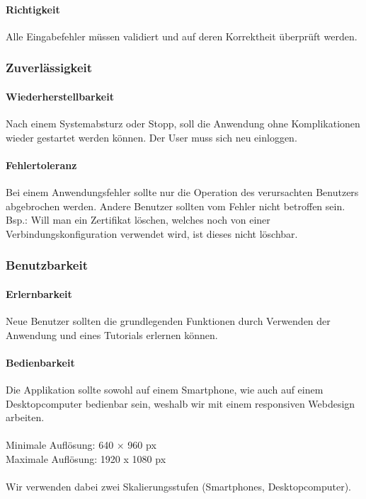 \paragraph{Richtigkeit}
Alle Eingabefehler müssen validiert und auf deren Korrektheit überprüft werden.

\subsubsection{Zuverlässigkeit}

\paragraph{Wiederherstellbarkeit}
Nach einem Systemabsturz oder Stopp, soll die Anwendung ohne Komplikationen wieder gestartet werden können. Der User muss sich neu einloggen.

\paragraph{Fehlertoleranz}
Bei einem Anwendungsfehler sollte nur die Operation des verursachten Benutzers abgebrochen werden. Andere Benutzer sollten vom Fehler nicht betroffen sein.\\
Bsp.: Will man ein Zertifikat löschen, welches noch von einer Verbindungskonfiguration verwendet wird, ist dieses nicht löschbar.

\subsubsection{Benutzbarkeit}

\paragraph{Erlernbarkeit}
Neue Benutzer sollten die grundlegenden Funktionen durch Verwenden der Anwendung und eines Tutorials erlernen können.

\paragraph{Bedienbarkeit}
Die Applikation sollte sowohl auf einem Smartphone, wie auch auf einem Desktopcomputer bedienbar sein, weshalb wir mit einem responsiven Webdesign arbeiten. \\\\
Minimale Auflösung: 	640 × 960 px \\
Maximale Auflösung: 	1920 x 1080 px \\\\
Wir verwenden dabei zwei Skalierungsstufen (Smartphones, Desktopcomputer).

